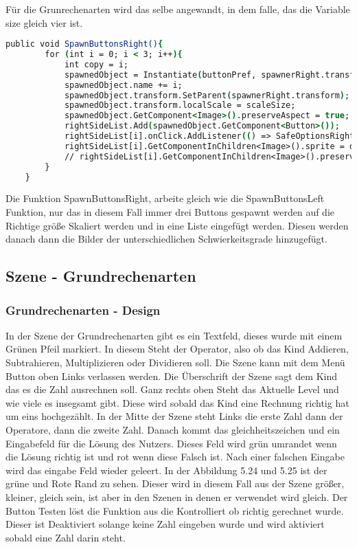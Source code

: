 Für die Grunrechenarten wird das selbe angewandt, in dem falle, das die Variable size gleich vier ist.
\begin{lstlisting}[language=csh, caption={MenuPickLevelAdvanced.cs SpawnButtonsRight Funktion}]
	public void SpawnButtonsRight(){
		for (int i = 0; i < 3; i++){
			int copy = i;
			spawnedObject = Instantiate(buttonPref, spawnerRight.transform.position, Quaternion.identity);
			spawnedObject.name += i;
			spawnedObject.transform.SetParent(spawnerRight.transform);
			spawnedObject.transform.localScale = scaleSize;
			spawnedObject.GetComponent<Image>().preserveAspect = true;
			rightSideList.Add(spawnedObject.GetComponent<Button>());
			rightSideList[i].onClick.AddListener(() => SafeOptionsRight(copy));
			rightSideList[i].GetComponentInChildren<Image>().sprite = difficulty[i];
			// rightSideList[i].GetComponentInChildren<Image>().preserveAspect = true;
		}
	}
\end{lstlisting}
Die Funktion SpawnButtonsRight, arbeite gleich wie die SpawnButtonsLeft Funktion, nur das in diesem Fall immer drei Buttons gespawnt werden auf die Richtige größe Skaliert werden und in eine Liste eingefügt werden. Diesen werden danach dann die Bilder der unterschiedlichen Schwierkeitsgrade hinzugefügt.
\subsection{Szene - Grundrechenarten}
\subsubsection{Grundrechenarten - Design}
In der Szene der Grundrechenarten gibt es ein Textfeld, dieses wurde mit einem Grünen Pfeil markiert. In diesem Steht der Operator, also ob das Kind Addieren, Subtrahieren, Multiplizieren oder Dividieren soll. Die Szene kann mit dem Menü Button oben Links verlassen werden. Die Überschrift der Szene sagt dem Kind das es die Zahl ausrechnen soll. Ganz rechts oben Steht das Aktuelle Level und wie viele es insegsamt gibt. Diese wird sobald das Kind eine Rechnung richtig hat um eins hochgezählt. In der Mitte der Szene steht Links die erste Zahl dann der Operatore, dann die zweite Zahl. Danach kommt das gleichheitszeichen und ein Eingabefeld für die Lösung des Nutzers. Dieses Feld wird grün umrandet wenn die Lösung richtig ist und rot wenn diese Falsch ist. Nach einer falschen Eingabe wird das eingabe Feld wieder geleert. In der Abbildung 5.24 und 5.25 ist der grüne und Rote Rand zu sehen. Dieser wird in diesem Fall aus der Szene größer, kleiner, gleich sein, ist aber in den Szenen in denen er verwendet wird gleich. 
Der Button Testen löst die Funktion aus die Kontrolliert ob richtig gerechnet wurde. Dieser ist Deaktiviert solange keine Zahl eingeben wurde und wird aktiviert sobald eine Zahl darin steht.
